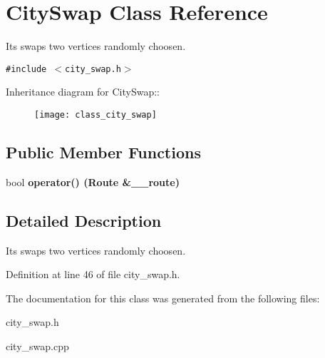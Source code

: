 \section{City\-Swap Class Reference}
\label{class_city_swap}
Its swaps two vertices randomly choosen.  


{\tt \#include $<$city\_\-swap.h$>$}

Inheritance diagram for City\-Swap::\begin{figure}[H]
\begin{center}
\leavevmode
\texttt{[image: class\_city\_swap]}
\end{center}
\end{figure}
\subsection*{Public Member Functions}
\begin{CompactItemize}
\item 
bool \bf{operator()} (\bf{Route} \&\_\-\_\-route)\label{class_city_swap_7e6958b62048c89604cbf046b86bdf2d}

\end{CompactItemize}


\subsection{Detailed Description}
Its swaps two vertices randomly choosen. 



Definition at line 46 of file city\_\-swap.h.

The documentation for this class was generated from the following files:\begin{CompactItemize}
\item 
city\_\-swap.h\item 
city\_\-swap.cpp\end{CompactItemize}
